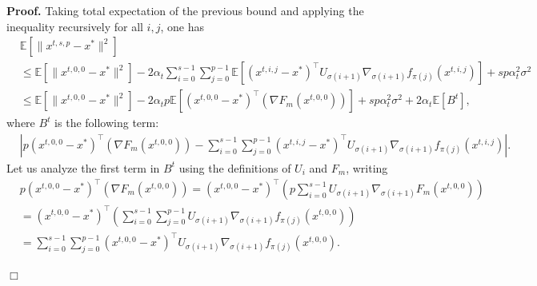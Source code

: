 \documentclass[11pt,a4paper]{article}
\numberwithin{equation}{section}%
\newenvironment{proof}[1][Proof]{\noindent \textbf{#1.} }{\hfill$\Box$\par\medskip}
\renewcommand{\(}{\left (}
\renewcommand{\)}{\right )}
\newcommand{\Fm}{F_m}
\begin{document}
\begin{proof}
Taking total expectation of the previous bound and applying the inequality recursively for all $i,j$, one has
\begin{align}\label{eq:bound_convex}
&\mathbb{E}[\|x^{t,s,p} - x^*\|^2]\nonumber \\
    &\leq \mathbb{E}[\|x^{t,0,0}- x^*\|^2] - 2\alpha_t\sum_{i=0}^{s-1}\sum_{j=0}^{p-1} \mathbb{E}[(x^{t,i,j}- x^*)^\top U_{\sigma(i+1)} \nabla_{\sigma(i+1)} f_{\pi(j)} (x^{t,i,j}) ] + sp\alpha_t^2 \sigma^2\nonumber \\
    &\leq \mathbb{E}[\|x^{t,0,0}- x^*\|^2] - 2\alpha_t p\mathbb{E}[(x^{t,0,0}- x^*)^\top(\nabla \Fm(x^{t,0,0}) )] + sp\alpha_t^2 \sigma^2
+2\alpha_t \mathbb{E}[B^t], 
\end{align}
where $B^t$ is the following term: 
\begin{align*}
     &\left|p(x^{t,0,0}- x^*)^\top(\nabla \Fm(x^{t,0,0}) )- \sum_{i=0}^{s-1}\sum_{j=0}^{p-1} (x^{t,i,j}- x^*)^\top U_{\sigma(i+1)} \nabla_{\sigma(i+1)} f_{\pi(j)} (x^{t,i,j}) \right|.
\end{align*}
Let us analyze the first term in $B^t$ using the definitions of $U_i$ and $\Fm$, writing %
\begin{align*}
     &p(x^{t,0,0}- x^*)^\top(\nabla \Fm(x^{t,0,0}) ) =(x^{t,0,0}- x^*)^\top\left(p\sum_{i=0}^{s-1} U_{\sigma(i+1)} \nabla_{\sigma(i+1)} \Fm (x^{t,0,0}) \right)\\ 
     &= (x^{t,0,0}- x^*)^\top\left(\sum_{i=0}^{s-1}\sum_{j=0}^{p-1} U_{\sigma(i+1)} \nabla_{\sigma(i+1)} f_{\pi(j)} (x^{t,0,0})\right)\\
     &=\sum_{i=0}^{s-1}\sum_{j=0}^{p-1} (x^{t,0,0}- x^*)^\top U_{\sigma(i+1)} \nabla_{\sigma(i+1)} f_{\pi(j)} (x^{t,0,0}).
\end{align*}

\end{proof}
\end{document}
